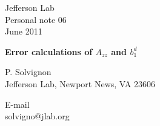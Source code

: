 \documentclass[11pt]{article}
\begin{document}
\thispagestyle{empty}
\renewcommand{\thefootnote}{\fnsymbol{footnote}}

\begin{flushright}
{\small
Jefferson Lab\\
Personal note 06\\
June 2011\\}
\end{flushright}

\vspace{.8cm}

\begin{center}
{\bf\large   
Error calculations of $A_{zz}$ and $b_1^d$}
\vspace{1cm}


P. Solvignon\\
Jefferson Lab,
Newport News, VA  23606\\

\medskip

E-mail\\
solvigno@jlab.org\\
\end{center}







\end{document}
